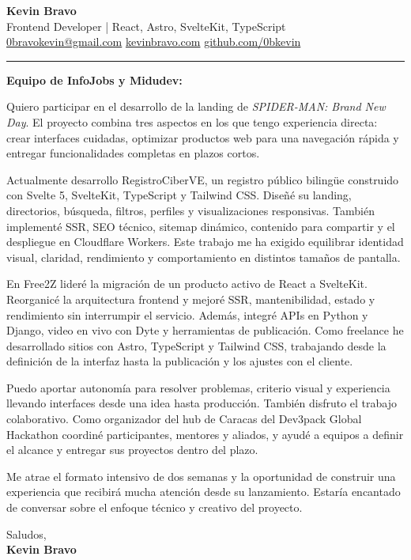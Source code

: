 \documentclass[11pt]{article}
\begin{document}
{\LARGE \textbf{Kevin Bravo}}\\[4pt]
Frontend Developer | React, Astro, SvelteKit, TypeScript\\[8pt]
\href{mailto:0bravokevin@gmail.com}{0bravokevin@gmail.com}
\quad\textbullet\quad
\href{https://kevinbravo.com}{kevinbravo.com}
\quad\textbullet\quad
\href{https://github.com/0bkevin}{github.com/0bkevin}

\vspace{8pt}
\hrule
\vspace{14pt}

\textbf{Equipo de InfoJobs y Midudev:}

Quiero participar en el desarrollo de la landing de \textit{SPIDER-MAN: Brand New Day}. El proyecto combina tres aspectos en los que tengo experiencia directa: crear interfaces cuidadas, optimizar productos web para una navegación rápida y entregar funcionalidades completas en plazos cortos.

Actualmente desarrollo RegistroCiberVE, un registro público bilingüe construido con Svelte 5, SvelteKit, TypeScript y Tailwind CSS. Diseñé su landing, directorios, búsqueda, filtros, perfiles y visualizaciones responsivas. También implementé SSR, SEO técnico, sitemap dinámico, contenido para compartir y el despliegue en Cloudflare Workers. Este trabajo me ha exigido equilibrar identidad visual, claridad, rendimiento y comportamiento en distintos tamaños de pantalla.

En Free2Z lideré la migración de un producto activo de React a SvelteKit. Reorganicé la arquitectura frontend y mejoré SSR, mantenibilidad, estado y rendimiento sin interrumpir el servicio. Además, integré APIs en Python y Django, video en vivo con Dyte y herramientas de publicación. Como freelance he desarrollado sitios con Astro, TypeScript y Tailwind CSS, trabajando desde la definición de la interfaz hasta la publicación y los ajustes con el cliente.

Puedo aportar autonomía para resolver problemas, criterio visual y experiencia llevando interfaces desde una idea hasta producción. También disfruto el trabajo colaborativo. Como organizador del hub de Caracas del Dev3pack Global Hackathon coordiné participantes, mentores y aliados, y ayudé a equipos a definir el alcance y entregar sus proyectos dentro del plazo.

Me atrae el formato intensivo de dos semanas y la oportunidad de construir una experiencia que recibirá mucha atención desde su lanzamiento. Estaría encantado de conversar sobre el enfoque técnico y creativo del proyecto.

Saludos,\\[3pt]
\textbf{Kevin Bravo}
\end{document}
